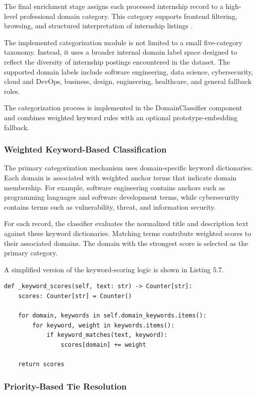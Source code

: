 The final enrichment stage assigns each processed internship record to a high-level professional domain category. This category supports frontend filtering, browsing, and structured interpretation of internship listings \cite{sarawagi2008information, senger2024deep}.

The implemented categorization module is not limited to a small five-category taxonomy. Instead, it uses a broader internal domain label space designed to reflect the diversity of internship postings encountered in the dataset. The supported domain labels include software engineering, data science, cybersecurity, cloud and DevOps, business, design, engineering, healthcare, and general fallback roles.

The categorization process is implemented in the DomainClassifier component and combines weighted keyword rules with an optional prototype-embedding fallback.

\subsubsection*{Weighted Keyword-Based Classification}

The primary categorization mechanism uses domain-specific keyword dictionaries. Each domain is associated with weighted anchor terms that indicate domain membership. For example, software engineering contains anchors such as programming languages and software development terms, while cybersecurity contains terms such as vulnerability, threat, and information security.

For each record, the classifier evaluates the normalized title and description text against these keyword dictionaries. Matching terms contribute weighted scores to their associated domains. The domain with the strongest score is selected as the primary category.

A simplified version of the keyword-scoring logic is shown in Listing 5.7.

\begin{lstlisting}[caption={Simplified weighted domain keyword scoring}]
def _keyword_scores(self, text: str) -> Counter[str]:
    scores: Counter[str] = Counter()

    for domain, keywords in self.domain_keywords.items():
        for keyword, weight in keywords.items():
            if keyword_matches(text, keyword):
                scores[domain] += weight

    return scores
\end{lstlisting}
\subsubsection*{Priority-Based Tie Resolution}

